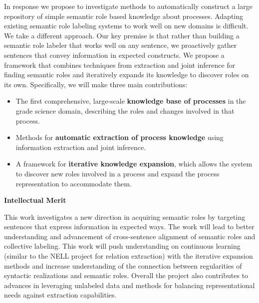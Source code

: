 In response we propose to investigate methods to automatically construct a large repository of simple semantic role based knowledge about processes. Adapting existing semantic role labeling systems to work well on new domains is difficult. We take a different approach. Our key premise is that rather than building a semantic role labeler that works well on any sentence, we proactively gather sentences that convey information in expected constructs. We propose a framework that combines techniques from extraction and joint inference for finding semantic roles and iteratively expands its knowledge to discover roles on its own.
Specifically, we will make three main contributions:
\begin{itemize}[noitemsep,nolistsep]
\item The first comprehensive, large-scale {\bf knowledge base of processes} in the grade science domain, describing the roles
      and changes involved in that process.
\item Methods for {\bf automatic extraction of process knowledge} using information extraction and joint inference.
\item A framework for {\bf iterative knowledge expansion}, which allows the system to discover new roles
     involved in a process and expand the process representation to accommodate them.
\end{itemize}

{\bf Intellectual Merit} 

This work investigates a new direction in acquiring semantic roles by targeting sentences that express information in expected ways. The work will lead to better understanding and advancement of cross-sentence alignment of semantic roles and collective labeling. This work will push understanding on continuous learning (similar to the NELL project for relation extraction) with the iterative expansion methods and increase understanding of the connection between regularities of syntactic realizations and semantic roles. Overall the project also contributes to advances in leveraging unlabeled data and methods for balancing representational needs against extraction capabilities.

